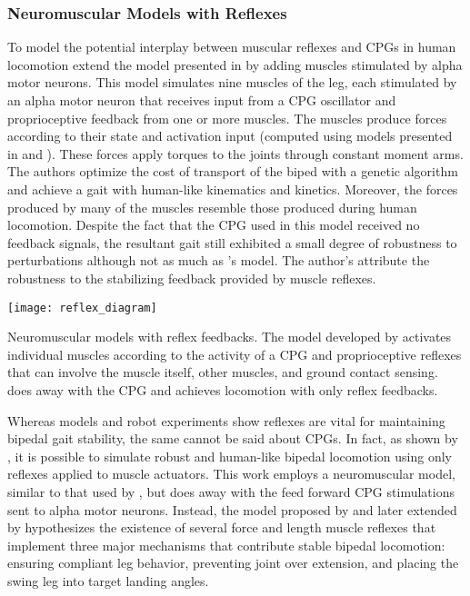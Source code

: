 \subsubsection{Neuromuscular Models with Reflexes}
To model the potential interplay between muscular reflexes and CPGs in human
locomotion \citet{ogihara2001generation} extend the model presented in
\citet{taga1991self} by adding muscles stimulated by alpha motor neurons. This
model simulates nine muscles of the leg, each stimulated by an alpha motor
neuron that receives input from a CPG oscillator and proprioceptive feedback
from one or more muscles. The muscles produce forces according to their state
and activation input (computed using models presented in
\citet{pierrynowski1985physiological} and \citet{davy1987dynamic}). These forces
apply torques to the joints through constant moment arms. The authors optimize
the cost of transport of the biped with a genetic algorithm and achieve a gait
with human-like kinematics and kinetics. Moreover, the forces produced by many
of the muscles resemble those produced during human locomotion. Despite the fact
that the CPG used in this model received no feedback signals, the resultant gait
still exhibited a small degree of robustness to perturbations although not as
much as \citeauthor{taga1991self}'s model. The author's attribute the robustness
to the stabilizing feedback provided by muscle reflexes. 
\begin{marginfigure}
    \centering
    \texttt{[image: reflex\_diagram]} 
    \caption{Neuromuscular models with reflex feedbacks. The model developed by
    \citet{ogihara2001generation} activates individual muscles according to the
    activity of a CPG and proprioceptive reflexes that can involve the muscle
    itself, other muscles, and ground contact sensing.  \citet{geyer2010muscle}
    does away with the CPG and achieves locomotion with only reflex feedbacks.}
    \label{fig:reflex_diagram}
\end{marginfigure}

Whereas models and robot experiments show reflexes are vital for maintaining
bipedal gait stability, the same cannot be said about CPGs. In fact, as shown by
\citet{geyer2010muscle}, it is possible to simulate robust and human-like
bipedal locomotion using only reflexes applied to muscle actuators. This work
employs a neuromuscular model, similar to that used by
\citet{ogihara2001generation}, but does away with the feed forward CPG
stimulations sent to alpha motor neurons. Instead, the model proposed by
\citet{geyer2010muscle} and later extended by \citet{song2015neural}
hypothesizes the existence of several force and length muscle reflexes that
implement three major mechanisms that contribute stable bipedal locomotion:
ensuring compliant leg behavior, preventing joint over extension, and placing
the swing leg into target landing angles. 

